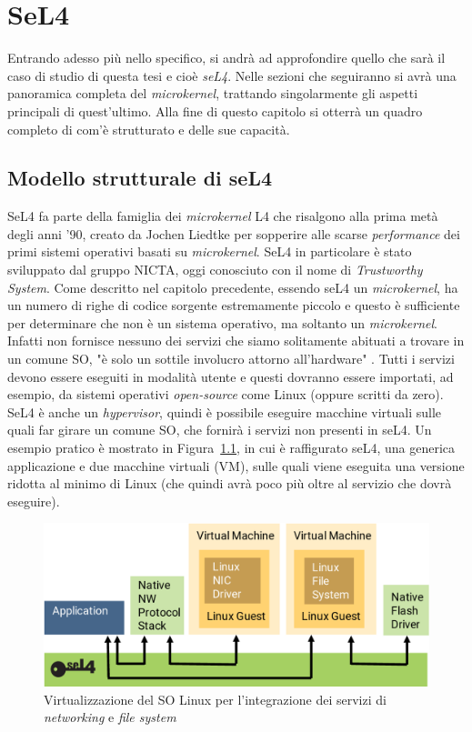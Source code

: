 \chapter{SeL4}
Entrando adesso più nello specifico, si andrà ad approfondire quello che sarà il caso di studio di questa tesi e cioè \textit{seL4}. Nelle sezioni che seguiranno si avrà una panoramica completa del \textit{microkernel}, trattando singolarmente gli aspetti principali di quest'ultimo. Alla fine di questo capitolo si otterrà un quadro completo di com'è strutturato e delle sue capacità.

\section{Modello strutturale di seL4}
SeL4 \cite{sel4-whitepaper} fa parte della famiglia dei \textit{microkernel} L4 che risalgono alla prima metà degli anni '90, creato da Jochen Liedtke per sopperire alle scarse \textit{performance} dei primi sistemi operativi basati su \textit{microkernel}. SeL4 in particolare è stato sviluppato dal gruppo NICTA, oggi conosciuto con il nome di \textit{Trustworthy System}.
Come descritto nel capitolo precedente, essendo seL4 un \textit{microkernel}, ha un numero di righe di codice sorgente estremamente piccolo e questo è sufficiente per determinare che non è un sistema operativo, ma soltanto un \textit{microkernel}. Infatti non fornisce nessuno dei servizi che siamo solitamente abituati a trovare in un comune SO, "è solo un sottile involucro attorno all'hardware" \cite{sel4-whitepaper}. Tutti i servizi devono essere eseguiti in modalità utente e questi dovranno essere importati, ad esempio, da sistemi operativi \textit{open-source} come Linux (oppure scritti da zero). SeL4 è anche un \textit{hypervisor}, quindi è possibile eseguire macchine virtuali sulle quali far girare un comune SO, che fornirà i servizi non presenti in seL4.
Un esempio pratico è mostrato in Figura~\ref{fig:Virtualizzazione}, in cui è raffigurato seL4, una generica applicazione e due macchine virtuali (VM), sulle quali viene eseguita una versione ridotta al minimo di Linux (che quindi avrà poco più oltre al servizio che dovrà eseguire).
\begin{figure}[h]
  \includegraphics[width=\linewidth]{img/seL4Hypervisor.png}
  \caption{Virtualizzazione del SO Linux per l'integrazione dei servizi di \textit{networking} e \textit{file system}}
  \label{fig:Virtualizzazione}
\end{figure}
